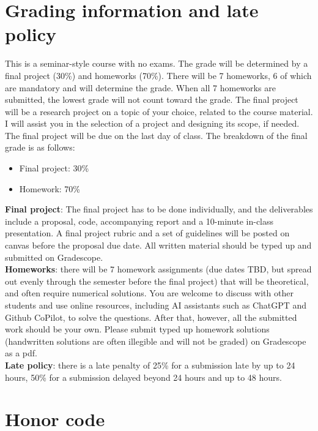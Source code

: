 \documentclass[12pt]{article}
\begin{document}
\section{Grading information and late policy}

This is a seminar-style course with no exams. The grade will be determined by a final project (30\%) and homeworks (70\%). There will be 7 homeworks, 6 of which are mandatory and will determine the grade. When all 7 homeworks are submitted, the lowest grade will not count toward the grade. The final project will be a research project on a topic of your choice, related to the course material. I will assist you in the selection of a project and designing its scope, if needed. The final project will be due on the last day of class. The breakdown of the final grade is as follows:
\begin{itemize}
	\item Final project: 30\%
	\item Homework: 70\% 
\end{itemize}

\textbf{Final project}: The final project has to be done individually, and the deliverables include a proposal, code, accompanying report and a 10-minute in-class presentation. A final project rubric and a set of guidelines will be posted on canvas before the proposal due date. All written material should be typed up and submitted on Gradescope.\\

\textbf{Homeworks}: there will be 7 homework assignments (due dates TBD, but spread out evenly through the semester before the final project) that will be theoretical, and often require numerical solutions. You are welcome to discuss with other students and use online resources, including AI assistants such as ChatGPT and Github CoPilot, to solve the questions. After that, however, all the submitted work should be your own. Please submit typed up homework solutions (handwritten solutions are often illegible and will not be graded) on Gradescope as a pdf. \\

\textbf{Late policy}: there is a late penalty of 25\% for a submission late by up to 24 hours, 50\% for a submission delayed beyond 24 hours and up to 48 hours. 

\section{Honor code}
\label{sec:honor}
\end{document}

